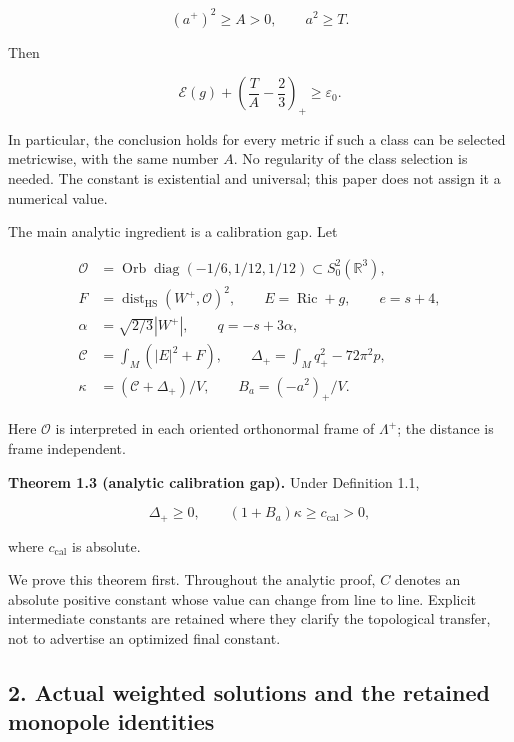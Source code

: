 \documentclass[
  11pt,
]{article}
\begin{document}
\[
                     (a^+)^2\ge A>0,\qquad a^2\ge T.
 \tag{1.5}
\]

Then

\[
 \boxed{\displaystyle
 \mathcal E(g)+\left(\frac TA-\frac23\right)_+
                         \ge\varepsilon_0.}              \tag{1.6}
\]

In particular, the conclusion holds for every metric if such a class can
be selected metricwise, with the same number \(A\). No regularity of the
class selection is needed. The constant is existential and universal;
this paper does not assign it a numerical value.

The main analytic ingredient is a calibration gap. Let

\[
 \begin{split}
 \mathcal O&=\operatorname{Orb}\operatorname{diag}
                    (-1/6,1/12,1/12)\subset S^2_0(\mathbb R^3),\\
 F&=\operatorname{dist}_{\mathrm{HS}}(W^+,\mathcal O)^2,\qquad
 E=\operatorname{Ric}+g,\qquad e=s+4,\\
 \alpha&=\sqrt{2/3}|W^+|,\qquad q=-s+3\alpha,\\
 \mathcal C&=\int_M(|E|^2+F),\qquad
 \Delta_+=\int_Mq_+^2-72\pi^2p,\\
 \kappa&=(\mathcal C+\Delta_+)/V,\qquad
 B_a=(-a^2)_+/V.
 \end{split}                                              \tag{1.7}
\]

Here \(\mathcal O\) is interpreted in each oriented orthonormal frame of
\(\Lambda^+\); the distance is frame independent.

\textbf{Theorem 1.3 (analytic calibration gap).} Under Definition 1.1,

\[
 \Delta_+\ge0,\qquad (1+B_a)\kappa\ge c_{\mathrm{cal}}>0, \tag{1.8}
\]

where \(c_{\mathrm{cal}}\) is absolute.

We prove this theorem first. Throughout the analytic proof, \(C\)
denotes an absolute positive constant whose value can change from line
to line. Explicit intermediate constants are retained where they clarify
the topological transfer, not to advertise an optimized final constant.

\hypertarget{actual-weighted-solutions-and-the-retained-monopole-identities}{%
\subsection{2. Actual weighted solutions and the retained monopole
identities}\label{actual-weighted-solutions-and-the-retained-monopole-identities}}
\end{document}
